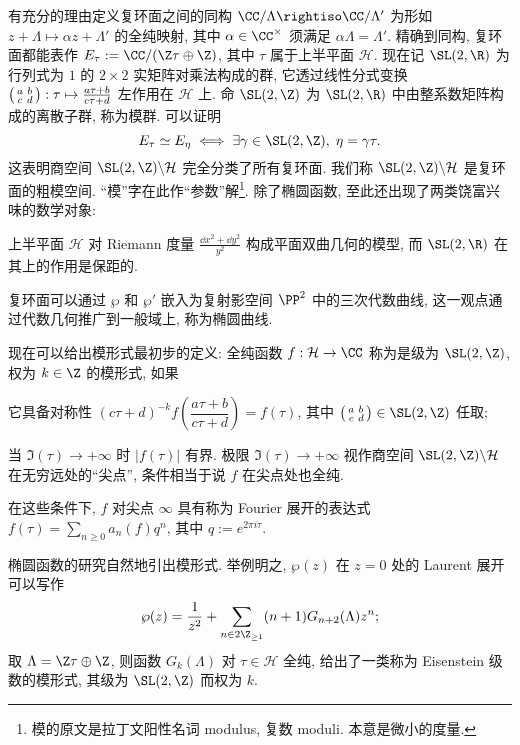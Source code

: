 有充分的理由定义复环面之间的同构 $\CC/\Lambda \rightiso \CC/\Lambda'$ 为形如 $z + \Lambda \mapsto \alpha z + \Lambda'$ 的全纯映射, 其中 $\alpha \in \CC^\times$ 须满足 $\alpha\Lambda = \Lambda'$. 精确到同构, 复环面都能表作 $E_\tau := \CC/(\Z\tau \oplus \Z)$, 其中 $\tau$ 属于上半平面 $\mathcal{H}$. 现在记 $\SL(2, \R)$ 为行列式为 $1$ 的 $2 \times 2$ 实矩阵对乘法构成的群, 它透过线性分式变换 $\bigl(\begin{smallmatrix} a & b \\ c & d \end{smallmatrix}\bigr): \tau \mapsto \frac{a\tau + b}{c\tau + d}$ 左作用在 $\mathcal{H}$ 上. 命 $\SL(2, \Z)$ 为 $\SL(2, \R)$ 中由整系数矩阵构成的离散子群, 称为模群. 可以证明
\[ E_\tau \simeq E_\eta \iff \exists \gamma \in \SL(2, \Z), \; \eta = \gamma\tau.  \]
这表明商空间 $\SL(2, \Z) \backslash \mathcal{H}$ 完全分类了所有复环面. 我们称 $\SL(2, \Z) \backslash \mathcal{H}$ 是复环面的粗模空间. ``模''字在此作``参数''解\footnote{模的原文是拉丁文阳性名词 modulus, 复数 moduli. 本意是微小的度量.}. 除了椭圆函数, 至此还出现了两类饶富兴味的数学对象:
\begin{compactitem}
	\item 上半平面 $\mathcal{H}$ 对 Riemann 度量 $\frac{\dd x^2 + \dd y^2}{y^2}$ 构成平面双曲几何的模型, 而 $\SL(2, \R)$ 在其上的作用是保距的.

	\item 复环面可以通过 $\wp$ 和 $\wp'$ 嵌入为复射影空间 $\PP^2$ 中的三次代数曲线, 这一观点通过代数几何推广到一般域上, 称为椭圆曲线.
\end{compactitem}

现在可以给出模形式最初步的定义: 全纯函数 $f: \mathcal{H} \to \CC$ 称为是级为 $\SL(2, \Z)$, 权为 $k \in \Z$ 的模形式, 如果
\begin{compactitem}
	\item 它具备对称性 $(c\tau + d)^{-k} f\left( \dfrac{a\tau+b}{c\tau+d} \right) = f(\tau)$, 其中 $\twomatrix{a}{b}{c}{d} \in \SL(2,\Z)$ 任取;
	\item 当 $\Im(\tau) \to +\infty$ 时 $|f(\tau)|$ 有界. 极限 $\Im(\tau) \to +\infty$ 视作商空间 $\SL(2, \Z) \backslash \mathcal{H}$ 在无穷远处的``尖点'', 条件相当于说 $f$ 在尖点处也全纯.
\end{compactitem}
在这些条件下, $f$ 对尖点 $\infty$ 具有称为 Fourier 展开的表达式 $f(\tau) = \sum_{n \geq 0} a_n(f) q^n$, 其中 $q := e^{2\pi i\tau}$.

椭圆函数的研究自然地引出模形式. 举例明之, $\wp(z)$ 在 $z=0$ 处的 Laurent 展开可以写作
\[ \wp(z) = \dfrac{1}{z^2} + \sum_{n \in 2\Z_{\geq 1}} (n+1) G_{n+2}(\Lambda) z^n; \]
取 $\Lambda = \Z\tau \oplus \Z$, 则函数 $G_k(\Lambda)$ 对 $\tau \in \mathcal{H}$ 全纯, 给出了一类称为 Eisenstein 级数的模形式, 其级为 $\SL(2, \Z)$ 而权为 $k$.

